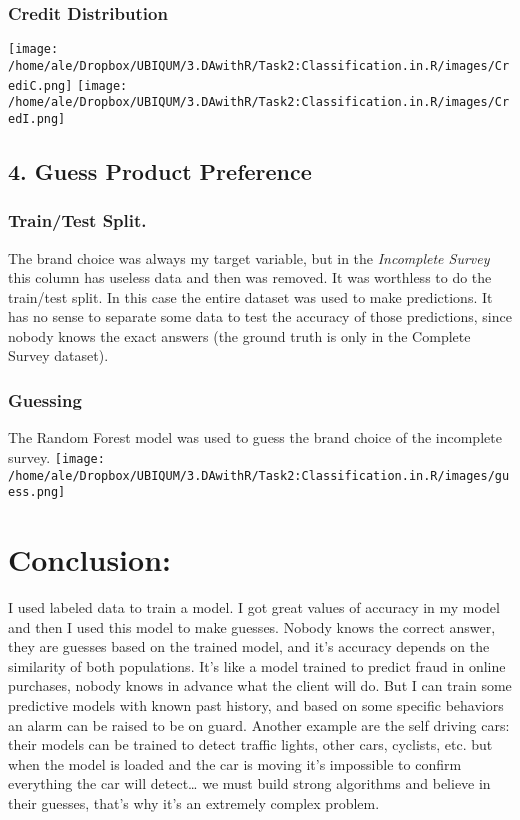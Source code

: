 \documentclass[
]{article}
\begin{document}
\hypertarget{credit-distribution}{%
\subsubsection{Credit Distribution}\label{credit-distribution}}

\texttt{[image: /home/ale/Dropbox/UBIQUM/3.DAwithR/Task2:Classification.in.R/images/CrediC.png]}
\texttt{[image: /home/ale/Dropbox/UBIQUM/3.DAwithR/Task2:Classification.in.R/images/CredI.png]}

\hypertarget{guess-product-preference}{%
\subsection{4. Guess Product
Preference}\label{guess-product-preference}}

\hypertarget{traintest-split.}{%
\subsubsection{Train/Test Split.}\label{traintest-split.}}

The brand choice was always my target variable, but in the
\emph{Incomplete Survey} this column has useless data and then was
removed. It was worthless to do the train/test split. In this case the
entire dataset was used to make predictions. It has no sense to separate
some data to test the accuracy of those predictions, since nobody knows
the exact answers (the ground truth is only in the Complete Survey
dataset).

\hypertarget{guessing}{%
\subsubsection{Guessing}\label{guessing}}

The Random Forest model was used to guess the brand choice of the
incomplete survey.
\texttt{[image: /home/ale/Dropbox/UBIQUM/3.DAwithR/Task2:Classification.in.R/images/guess.png]}

\hypertarget{conclusion}{%
\section{Conclusion:}\label{conclusion}}

I used labeled data to train a model. I got great values of accuracy in
my model and then I used this model to make guesses. Nobody knows the
correct answer, they are guesses based on the trained model, and it's
accuracy depends on the similarity of both populations. It's like a
model trained to predict fraud in online purchases, nobody knows in
advance what the client will do. But I can train some predictive models
with known past history, and based on some specific behaviors an alarm
can be raised to be on guard. Another example are the self driving cars:
their models can be trained to detect traffic lights, other cars,
cyclists, etc. but when the model is loaded and the car is moving it's
impossible to confirm everything the car will detect\ldots{} we must
build strong algorithms and believe in their guesses, that's why it's an
extremely complex problem.
\end{document}
